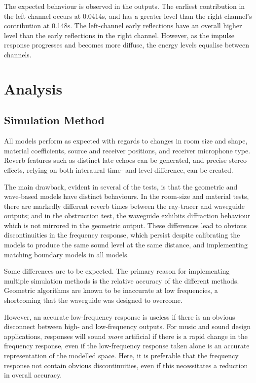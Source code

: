 \documentclass[]{scrreprt}
\begin{document}
The expected behaviour is observed in the outputs. The earliest
contribution in the left channel occurs at 0.0414s, and has a greater
level than the right channel's contribution at 0.148s. The left-channel
early reflections have an overall higher level than the early
reflections in the right channel. However, as the impulse response
progresses and becomes more diffuse, the energy levels equalise between
channels.

\section{Analysis}\label{analysis}

\subsection{Simulation Method}\label{simulation-method}

All models perform as expected with regards to changes in room size and
shape, material coefficients, source and receiver positions, and
receiver microphone type. Reverb features such as distinct late echoes
can be generated, and precise stereo effects, relying on both interaural
time- and level-difference, can be created.

The main drawback, evident in several of the tests, is that the
geometric and wave-based models have distinct behaviours. In the
room-size and material tests, there are markedly different reverb times
between the ray-tracer and waveguide outputs; and in the obstruction
test, the waveguide exhibits diffraction behaviour which is not mirrored
in the geometric output. These differences lead to obvious
discontinuities in the frequency response, which persist despite
calibrating the models to produce the same sound level at the same
distance, and implementing matching boundary models in all models.

Some differences are to be expected. The primary reason for implementing
multiple simulation methods is the relative accuracy of the different
methods. Geometric algorithms are known to be inaccurate at low
frequencies, a shortcoming that the waveguide was designed to overcome.

However, an accurate low-frequency response is useless if there is an
obvious disconnect between high- and low-frequency outputs. For music
and sound design applications, responses will sound \emph{more}
artificial if there is a rapid change in the frequency response, even if
the low-frequency response taken alone is an accurate representation of
the modelled space. Here, it is preferable that the frequency response
not contain obvious discontinuities, even if this necessitates a
reduction in overall accuracy.
\end{document}
